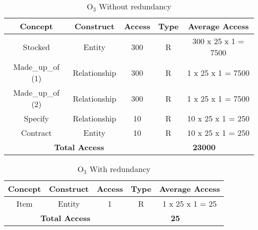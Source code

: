 \begin{table}[!h]\caption{	$ \textrm{O}_\textrm{3} $ Without redundancy }
	\begin{center}
		\begin{tabular}{| c | c | c | c | c |}
			\hline
			\textbf{Concept} & \textbf{Construct} & \textbf{Access} & \textbf{Type} & \textbf{Average Access} \\ \hline
			Stocked & Entity & 300 & R & 300 x 25 x 1 = 7500 \\ \hline
			Made\_up\_of (1) & Relationship & 300 & R & 1 x 25 x 1 = 7500 \\ \hline
			Made\_up\_of (2) & Relationship & 300 & R & 1 x 25 x 1 = 7500 \\ \hline
			Specify & Relationship & 10 & R & 10 x 25 x 1 = 250 \\ \hline
			Contract & Entity & 10 & R & 10 x 25 x 1 = 250 \\ \hline
			\multicolumn{3}{|c|}{\textbf{Total Access}} & \multicolumn{2}{|c|}{\textbf{23000}} \\ \hline
		\end{tabular}
	\end{center}
\end{table}
\begin{table}[!h]\caption{	$ \textrm{O}_\textrm{3} $ With redundancy }
	\begin{center}
		\begin{tabular}{| c | c | c | c | c |}
			\hline
			\textbf{Concept} & \textbf{Construct} & \textbf{Access} & \textbf{Type} & \textbf{Average Access} \\ \hline
			Item & Entity & 1 & R & 1 x 25 x 1 = 25 \\ \hline
			\multicolumn{3}{|c|}{\textbf{Total Access}} & \multicolumn{2}{|c|}{\textbf{25}} \\ \hline
		\end{tabular}
	\end{center}
\end{table}

